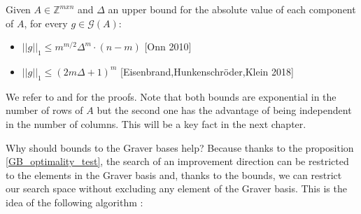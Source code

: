 \label{GB_bounds}
\begin{proposition}
Given $A \in \mathbb{Z}^{mxn}$ and $\Delta$ an upper bound for the absolute value of each component of $A$, for every $g \in \mathcal{G}(A)$:
\vspace{-10pt}
\begin{itemize}
    \item $||g||_1 \leq m^{m/2}\Delta^m\cdot(n - m)$ \hspace{10pt}[Onn 2010]
    \item $||g||_1 \leq (2m \Delta + 1)^m$ \hspace{41pt}[Eisenbrand,Hunkenschröder,Klein 2018]
\end{itemize}
\end{proposition}

We refer to \cite{ONN:2010} and \cite{EISENBRAND:2018} for the proofs. Note that both bounds are exponential in the number of rows of $A$ but the second one has the advantage of being independent in the number of columns. This will be a key fact in the next chapter.

Why should bounds to the Graver bases help? Because thanks to the proposition \ref{GB_optimality_test}, the search of an improvement direction can be restricted to the elements in the Graver basis and, thanks to the bounds, we can restrict our search space without excluding any element of the Graver basis. This is the idea of the following algorithm \cite{HEMMECKE:2011}:

